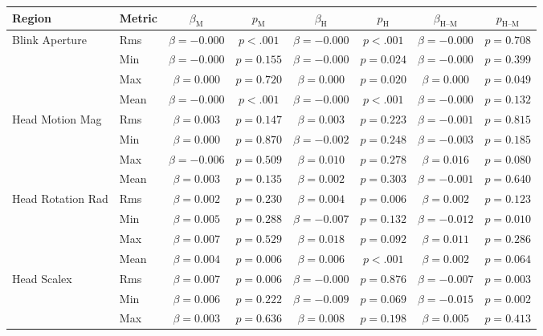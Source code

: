 \begin{tabular}{llcc|cc|cc}
\toprule
Region & Metric & $\beta_{\text{M}}$ & $p_{\text{M}}$ & $\beta_{\text{H}}$ & $p_{\text{H}}$ & $\beta_{\text{H--M}}$ & $p_{\text{H--M}}$ \\
\midrule
\multirow{4}{*}{Blink Aperture} & Rms & $\beta = -0.000$ & $p < .001$ & $\beta = -0.000$ & $p < .001$ & $\beta = -0.000$ & $p = 0.708$ \\
 & Min & $\beta = -0.000$ & $p = 0.155$ & $\beta = -0.000$ & $p = 0.024$ & $\beta = -0.000$ & $p = 0.399$ \\
 & Max & $\beta = 0.000$ & $p = 0.720$ & $\beta = 0.000$ & $p = 0.020$ & $\beta = 0.000$ & $p = 0.049$ \\
 & Mean & $\beta = -0.000$ & $p < .001$ & $\beta = -0.000$ & $p < .001$ & $\beta = -0.000$ & $p = 0.132$ \\
\midrule
\multirow{4}{*}{Head Motion Mag} & Rms & $\beta = 0.003$ & $p = 0.147$ & $\beta = 0.003$ & $p = 0.223$ & $\beta = -0.001$ & $p = 0.815$ \\
 & Min & $\beta = 0.000$ & $p = 0.870$ & $\beta = -0.002$ & $p = 0.248$ & $\beta = -0.003$ & $p = 0.185$ \\
 & Max & $\beta = -0.006$ & $p = 0.509$ & $\beta = 0.010$ & $p = 0.278$ & $\beta = 0.016$ & $p = 0.080$ \\
 & Mean & $\beta = 0.003$ & $p = 0.135$ & $\beta = 0.002$ & $p = 0.303$ & $\beta = -0.001$ & $p = 0.640$ \\
\midrule
\multirow{4}{*}{Head Rotation Rad} & Rms & $\beta = 0.002$ & $p = 0.230$ & $\beta = 0.004$ & $p = 0.006$ & $\beta = 0.002$ & $p = 0.123$ \\
 & Min & $\beta = 0.005$ & $p = 0.288$ & $\beta = -0.007$ & $p = 0.132$ & $\beta = -0.012$ & $p = 0.010$ \\
 & Max & $\beta = 0.007$ & $p = 0.529$ & $\beta = 0.018$ & $p = 0.092$ & $\beta = 0.011$ & $p = 0.286$ \\
 & Mean & $\beta = 0.004$ & $p = 0.006$ & $\beta = 0.006$ & $p < .001$ & $\beta = 0.002$ & $p = 0.064$ \\
\midrule
\multirow{4}{*}{Head Scalex} & Rms & $\beta = 0.007$ & $p = 0.006$ & $\beta = -0.000$ & $p = 0.876$ & $\beta = -0.007$ & $p = 0.003$ \\
 & Min & $\beta = 0.006$ & $p = 0.222$ & $\beta = -0.009$ & $p = 0.069$ & $\beta = -0.015$ & $p = 0.002$ \\
 & Max & $\beta = 0.003$ & $p = 0.636$ & $\beta = 0.008$ & $p = 0.198$ & $\beta = 0.005$ & $p = 0.413$ \\

\end{tabular}

